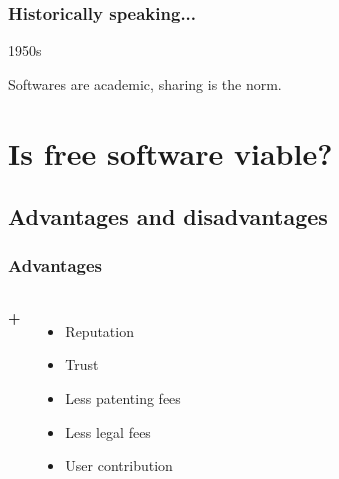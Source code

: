\documentclass{beamer}
\begin{document}
\begin{frame}

  \frametitle{Historically speaking...}

  \begin{block}{1950s}
    \begin{center}Softwares are academic, sharing is the norm.\end{center}
  \end{block}



\end{frame}

\section{Is free software viable?}

\subsection{Advantages and disadvantages}

\begin{frame}

  \frametitle{Advantages}

  \begin{columns}

    \begin{center}
      \Huge{\textbf{+}}
    \end{center}

    \begin{itemize}
      \item<2->{Reputation}
      \item<3->{Trust}
      \item<4->{Less patenting fees}
      \item<5->{Less legal fees}
      \item<6->{User contribution}
    \end{itemize}

  \end{columns}

\end{frame}
\end{document}
